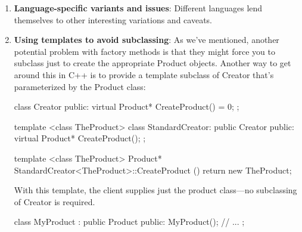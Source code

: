 \documentclass{report}
\begin{document}
\begin{itemize}
\begin{enumerate}
\begin{cppcode}
{                            return Creator::Create(id); // called if all others fail
                        }
                    \end{cppcode}
                    \bigbreak \noindent 
                    Notice that the last thing this operation does is call Create on the parent class. That's because MyCreator::Create handles only YOURS, MINE, and THEIRS differently than the parent class. It isn't interested in other classes. Hence MyCreator extends the kinds of products created, and it defers responsibility for creating all but a few products to its parent.
                \item \textbf{Language-specific variants and issues}: Different languages lend themselves to other interesting variations and caveats.
                \item \textbf{Using templates to avoid subclassing}: As we've mentioned, another potential problem with factory methods is that they might force you to subclass just to create the appropriate Product objects. Another way to get around this in C++ is to provide a template subclass of Creator that's parameterized by the Product class:
                    \bigbreak \noindent 
                    \begin{cppcode}
                        class Creator {
                            public:
                            virtual Product* CreateProduct() = 0;
                        };

                        template <class TheProduct>
                        class StandardCreator: public Creator {
                            public:
                            virtual Product* CreateProduct();
                        };

                        template <class TheProduct>
                        Product* StandardCreator<TheProduct>::CreateProduct () {
                            return new TheProduct;
                        }
                    \end{cppcode}
                    \bigbreak \noindent 
                    With this template, the client supplies just the product class—no subclassing of Creator is required.
                    \bigbreak \noindent 
                    \begin{cppcode}
                        class MyProduct : public Product {
                            public:
                            MyProduct();
                            // ...
                        };


\end{cppcode}
\end{enumerate}
\end{itemize}
\end{document}
